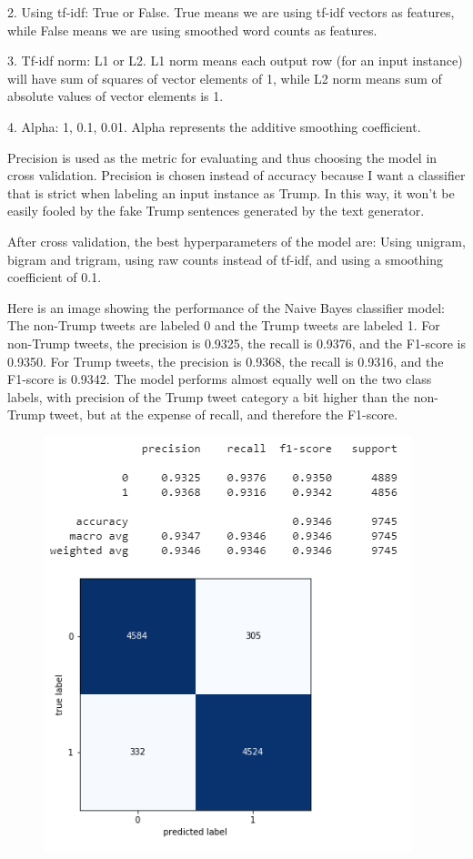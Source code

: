 \documentclass{article}
\begin{document}
2. Using tf-idf: True or False. True means we are using tf-idf vectors as features, while False means we are using smoothed word counts as features.

3. Tf-idf norm: L1 or L2. L1 norm means each output row (for an input instance) will have sum of squares of vector elements of 1, while L2 norm means sum of absolute values of vector elements is 1.  

4. Alpha: 1, 0.1, 0.01. Alpha represents the additive smoothing coefficient.

Precision is used as the metric for evaluating and thus choosing the model in cross validation. Precision is chosen instead of accuracy because I want a classifier that is strict when labeling an input instance as Trump. In this way, it won't be easily fooled by the fake Trump sentences generated by the text generator.

After cross validation, the best hyperparameters of the model are: Using unigram, bigram and trigram, using raw counts instead of tf-idf, and using a smoothing coefficient of 0.1.

Here is an image showing the performance of the Naive Bayes classifier model: The non-Trump tweets are labeled 0 and the Trump tweets are labeled 1. For non-Trump tweets, the precision is 0.9325, the recall is 0.9376, and the F1-score is 0.9350. For Trump tweets, the precision is 0.9368, the recall is 0.9316, and the F1-score is 0.9342. The model performs almost equally well on the two class labels, with precision of the Trump tweet category a bit higher than the non-Trump tweet, but at the expense of recall, and therefore the F1-score.

\begin{figure}
\centering
\includegraphics{img/CLF_NB.PNG}
\end{figure}
\end{document}
